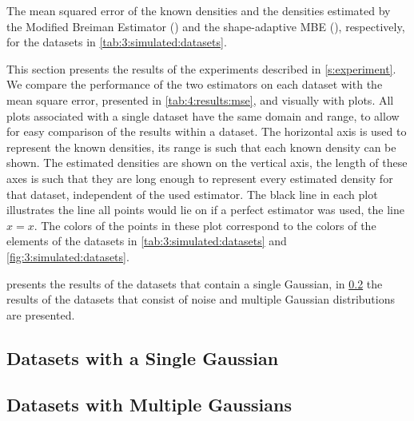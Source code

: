 
\begin{table}
	\centering
	
	\caption{The mean squared error of the known densities and the densities estimated by the Modified Breiman Estimator (\mbe) and the shape-adaptive MBE (\sambe), respectively, for the datasets in \cref{tab:3:simulated:datasets}.} 	
	\label{tab:4:results:mse}
\end{table}

This section presents the results of the experiments described in \cref{s:experiment}. 
We compare the performance of the two estimators on each dataset with the mean square error, presented in \cref{tab:4:results:mse}, and visually with plots. 
	All plots associated with a single dataset have the same domain and range, to allow for easy comparison of the results within a dataset. The horizontal axis is used to represent the known densities, its range is such that each known density can be shown. The estimated densities are shown on the vertical axis, the length of these axes is such that they are long enough to represent every estimated density for that dataset, independent of the used estimator. 
	The black line in each plot illustrates the line all points would lie on if a perfect estimator was used, \ie the line $x = x$.
	The colors of the points in these plot correspond to the colors of the elements of the datasets in \cref{tab:3:simulated:datasets} and \cref{fig:3:simulated:datasets}. 

	 presents the results of the datasets that contain a single Gaussian, in \cref{s:results:multipleGaussian} the results of the datasets that consist of noise and multiple Gaussian distributions are presented. 

\subsection{Datasets with a Single Gaussian}
\label{s:results:singleGaussian}


\subsection{Datasets with Multiple Gaussians}
\label{s:results:multipleGaussian}

